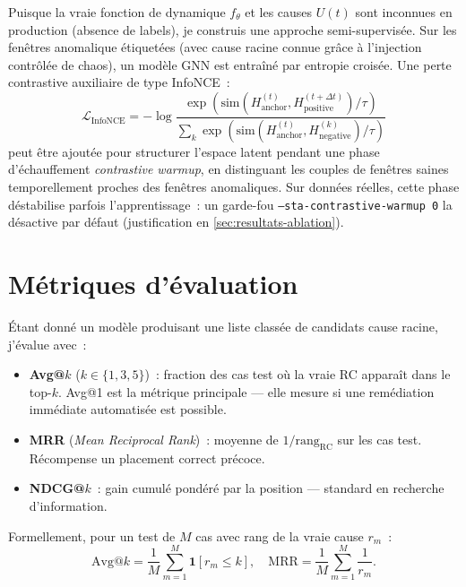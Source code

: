 \documentclass[a4paper,11pt,oneside]{report}
\begin{document}
Puisque la vraie fonction de dynamique $f_\theta$ et les causes $U(t)$ sont inconnues en production (absence de labels), je construis une approche semi-supervis\'ee. Sur les fen\^etres anomalique \'etiquet\'ees (avec cause racine connue gr\^ace \`a l'injection contr\^ol\'ee de chaos), un mod\`ele GNN est entra\^in\'e par entropie crois\'ee. Une perte contrastive auxiliaire de type InfoNCE~:
\begin{equation}
  \mathcal{L}_{\mathrm{InfoNCE}} = -\log \frac{\exp\!\left(\mathrm{sim}(H^{(t)}_{\mathrm{anchor}}, H^{(t+\Delta t)}_{\mathrm{positive}})/\tau\right)}{\sum_k \exp\!\left(\mathrm{sim}(H^{(t)}_{\mathrm{anchor}}, H^{(k)}_{\mathrm{negative}})/\tau\right)}
  \label{eq:infonce}
\end{equation}
peut \^etre ajout\'ee pour structurer l'espace latent pendant une phase d'\'echauffement \emph{contrastive warmup}, en distinguant les couples de fen\^etres saines temporellement proches des fen\^etres anomaliques. Sur donn\'ees r\'eelles, cette phase d\'estabilise parfois l'apprentissage~: un garde-fou \texttt{--sta-contrastive-warmup 0} la d\'esactive par d\'efaut (justification en \cref{sec:resultats-ablation}).

\section{M\'etriques d'\'evaluation}
\label{sec:metriques}

\'Etant donn\'e un mod\`ele produisant une liste class\'ee de candidats cause racine, j'\'evalue avec~:
\begin{itemize}
  \item \textbf{Avg@$k$} ($k \in \{1,3,5\}$)~: fraction des cas test o\`u la vraie RC appara\^it dans le top-$k$. Avg@1 est la m\'etrique principale --- elle mesure si une rem\'ediation imm\'ediate automatis\'ee est possible.
  \item \textbf{MRR} (\emph{Mean Reciprocal Rank})~: moyenne de $1 / \mathrm{rang}_{\mathrm{RC}}$ sur les cas test. R\'ecompense un placement correct pr\'ecoce.
  \item \textbf{NDCG@$k$}~: gain cumul\'e pond\'er\'e par la position --- standard en recherche d'information.
\end{itemize}
Formellement, pour un test de $M$ cas avec rang de la vraie cause $r_m$~:
\begin{equation}
  \mathrm{Avg@}k = \frac{1}{M} \sum_{m=1}^M \mathbf{1}[r_m \le k], \quad
  \mathrm{MRR} = \frac{1}{M} \sum_{m=1}^M \frac{1}{r_m}.
  \label{eq:metriques}
\end{equation}
\end{document}
